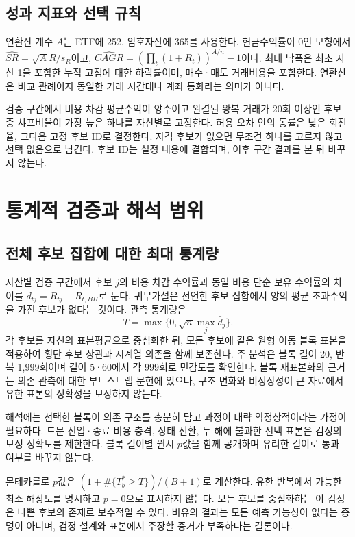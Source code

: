 \documentclass[11pt,a4paper]{article}
\begin{document}
\subsection{성과 지표와 선택 규칙}
연환산 계수 $A$는 ETF에 252, 암호자산에 365를 사용한다. 현금수익률이 0인 모형에서 $\widehat{SR}=\sqrt{A}\bar R/s_R$이고, $\widehat{CAGR}=(\prod_t(1+R_t))^{A/n}-1$이다. 최대 낙폭은 최초 자산 1을 포함한 누적 고점에 대한 하락률이며, 매수·매도 거래비용을 포함한다. 연환산은 비교 관례이지 동일한 거래 시간대나 계좌 통화라는 의미가 아니다.

검증 구간에서 비용 차감 평균수익이 양수이고 완결된 왕복 거래가 20회 이상인 후보 중 샤프비율이 가장 높은 하나를 자산별로 고정한다. 허용 오차 안의 동률은 낮은 회전율, 그다음 고정 후보 ID로 결정한다. 자격 후보가 없으면 무조건 하나를 고르지 않고 선택 없음으로 남긴다. 후보 ID는 설정 내용에 결합되며, 이후 구간 결과를 본 뒤 바꾸지 않는다.

\section{통계적 검증과 해석 범위}
\subsection{전체 후보 집합에 대한 최대 통계량}
자산별 검증 구간에서 후보 $j$의 비용 차감 수익률과 동일 비용 단순 보유 수익률의 차이를 $d_{tj}=R_{tj}-R_{t,BH}$로 둔다. 귀무가설은 선언한 후보 집합에서 양의 평균 초과수익을 가진 후보가 없다는 것이다. 관측 통계량은
\begin{equation}
 T=\max\{0,\sqrt{n}\max_j\bar d_j\}.
\end{equation}
각 후보를 자신의 표본평균으로 중심화한 뒤, 모든 후보에 같은 원형 이동 블록 표본을 적용하여 횡단 후보 상관과 시계열 의존을 함께 보존한다. 주 분석은 블록 길이 20, 반복 1,999회이며 길이 5·60에서 각 999회로 민감도를 확인한다. 블록 재표본화의 근거는 의존 관측에 대한 부트스트랩 문헌\cite{kunsch}에 있으나, 구조 변화와 비정상성이 큰 자료에서 유한 표본의 정확성을 보장하지 않는다.

해석에는 선택한 블록이 의존 구조를 충분히 담고 과정이 대략 약정상적이라는 가정이 필요하다. 드문 진입·종료 비용 충격, 상태 전환, 두 해에 불과한 선택 표본은 검정의 보정 정확도를 제한한다. 블록 길이별 원시 $p$값을 함께 공개하며 유리한 길이로 통과 여부를 바꾸지 않는다.

몬테카를로 $p$값은 $(1+\#\{T_b^*\ge T\})/(B+1)$로 계산한다. 유한 반복에서 가능한 최소 해상도를 명시하고 $p=0$으로 표시하지 않는다. 모든 후보를 중심화하는 이 검정은 나쁜 후보의 존재로 보수적일 수 있다. 비유의 결과는 모든 예측 가능성이 없다는 증명이 아니며, 검정 설계와 표본에서 주장할 증거가 부족하다는 결론이다.
\end{document}
